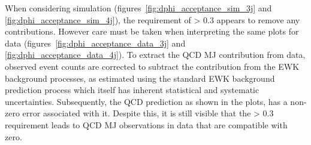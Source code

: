 % 
When considering simulation (figures~\ref{fig:dphi_acceptance_sim_3j} and
\ref{fig:dphi_acceptance_sim_4j}), the requirement of \mindphistar > 0.3 appears
to remove any contributions. However care
must be taken when interpreting the same plots for data
(figures~\ref{fig:dphi_acceptance_data_3j} and
\ref{fig:dphi_acceptance_data_4j}). To extract the QCD MJ contribution from
data,
observed event counts are corrected to subtract the contribution from the EWK
background processes, as estimated using the standard EWK background prediction
process which itself has inherent statistical and systematic uncertainties.
Subsequently, the QCD prediction as shown in the plots, has a non-zero error
associated
with it. Despite this, it is still visible that the \mindphistar > 0.3
requirement
leads to QCD MJ observations in data that are compatible with zero.




